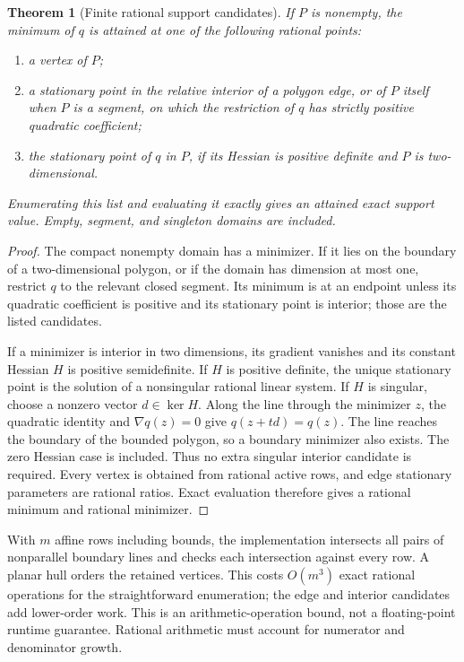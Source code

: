 \documentclass[11pt]{article}
\newtheorem{theorem}{Theorem}[section]
\theoremstyle{definition}
\theoremstyle{remark}
\begin{document}
\begin{theorem}[Finite rational support candidates]\label{thm:polygon}
If $P$ is nonempty, the minimum of $q$ is attained at one of the following
rational points:
\begin{enumerate}
\item a vertex of $P$;
\item a stationary point in the relative interior of a polygon edge,
      or of $P$ itself when $P$ is a segment, on which the restriction
      of $q$ has strictly positive quadratic coefficient;
\item the stationary point of $q$ in $P$, if its Hessian is positive
      definite and $P$ is two-dimensional.
\end{enumerate}
Enumerating this list and evaluating it exactly gives an attained exact
support value. Empty, segment, and singleton domains are included.
\end{theorem}
\begin{proof}
The compact nonempty domain has a minimizer. If it lies on the boundary
of a two-dimensional polygon, or if the domain has dimension at most
one, restrict $q$ to the relevant closed segment. Its minimum is at an
endpoint unless its quadratic coefficient is positive and its stationary
point is interior; those are the listed candidates.

If a minimizer is interior in two dimensions, its gradient vanishes and
its constant Hessian $H$ is positive semidefinite. If $H$ is positive
definite, the unique stationary point is the solution of a nonsingular
rational linear system. If $H$ is singular, choose a nonzero vector
$d\in\ker H$. Along the line through the minimizer $z$, the quadratic
identity and $\nabla q(z)=0$ give $q(z+td)=q(z)$. The line reaches the
boundary of the bounded polygon, so a boundary minimizer also exists.
The zero Hessian case is included. Thus no extra singular interior
candidate is required. Every vertex is obtained from rational active
rows, and edge stationary parameters are rational ratios. Exact
evaluation therefore gives a rational minimum and rational minimizer.
\end{proof}

With $m$ affine rows including bounds, the implementation intersects all
pairs of nonparallel boundary lines and checks each intersection against
every row. A planar hull orders the retained vertices. This costs
$O(m^3)$ exact rational operations for the straightforward enumeration;
the edge and interior candidates add lower-order work. This is an
arithmetic-operation bound, not a floating-point runtime guarantee.
Rational arithmetic must account for numerator and denominator growth.
\end{document}
